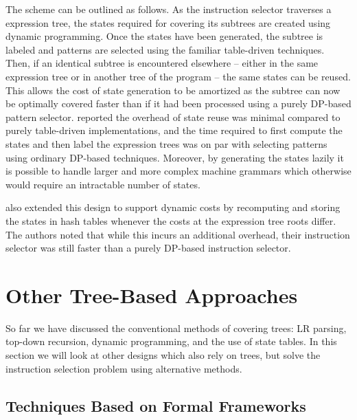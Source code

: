 {The scheme can be outlined as follows.
%
As the \gls{instruction selector} traverses a \gls{expression tree}, the
\glspl{state} required for covering its \glspl{subtree} are created using
dynamic programming.
%
Once the \glspl{state} have been generated, the \gls{subtree} is labeled and
\glspl{pattern} are selected using the familiar table-driven techniques.
%
Then, if an identical \gls{subtree} is encountered elsewhere -- either in the
same \gls{expression tree} or in another \gls{tree} of the \gls{program} -- the
same \glspl{state} can be reused.
%
This allows the cost of \gls{state} generation to be amortized as the
\gls{subtree} can now be optimally covered faster than if it had been processed
using a purely \gls{DP}-based \gls{pattern selector}.
%
\citeauthor{Ertl2006} reported the overhead of \gls{state} reuse was minimal
compared to purely table-driven implementations, and the time required to first
compute the \glspl{state} and then label the \glspl{expression tree} was on par
with selecting \glspl{pattern} using ordinary \gls{DP}-based techniques.
%
Moreover, by generating the \glspl{state} lazily it is possible to handle larger
and more complex \glspl{machine grammar} which otherwise would require an
intractable number of \glspl{state}.

\citeauthor{Ertl2006} also extended this design to support dynamic costs by
recomputing and storing the \glspl{state} in hash tables whenever the costs at
the \gls{expression tree} \glspl{root} differ.
%
The authors noted that while this incurs an additional overhead, their
\gls{instruction selector} was still faster than a purely \gls{DP}-based
\gls{instruction selector}.


\section{Other Tree-Based Approaches}

So far we have discussed the conventional methods of covering \glspl{tree}:
\gls{LR parsing}, top-down recursion, dynamic programming, and the use of
\gls{state} tables.
%
In this section we will look at other designs which also rely on \glspl{tree},
but solve the \gls{instruction selection} problem using alternative methods.


\subsection{Techniques Based on Formal Frameworks}

}
